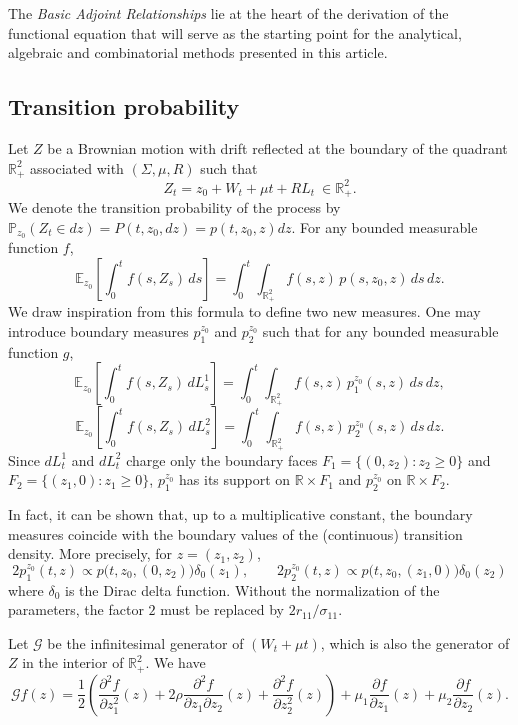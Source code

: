 \documentclass[11pt]{article}
\theoremstyle{definition}
\begin{document}
The \emph{Basic Adjoint Relationships} lie at the heart of the derivation of the functional equation that will serve as the starting point for the analytical, algebraic and combinatorial methods presented in this article.
 
\subsection{Transition probability}

Let $Z$ be a Brownian motion with drift reflected at the boundary of the quadrant $\mathbb{R}_+^2$ associated with $(\Sigma, \mu, R)$ such that
$$ Z_t=z_0 + W_t + \mu t + R L_t \ \in \mathbb{R}_+^2.$$ 
We denote the transition probability of the process by $\mathbb{P}_{z_0}(Z_t\in dz)=P(t,z_0,dz)=p(t,z_0,z) dz$.
For any bounded measurable function $f$,
\[
\mathbb{E}_{z_0}\!\left[\int_0^t f(s,Z_s)\,ds\right]
=\int_0^t\!\int_{\mathbb{R}_+^2} f(s,z)\,p(s,z_0,z)\,ds\,dz.
\]
We draw inspiration from this formula to define two new measures.
One may introduce boundary measures $p_1^{z_0}$ and $p_2^{z_0}$ such that for any bounded measurable function $g$, 
\[
\mathbb{E}_{z_0}\!\left[\int_0^t f(s,Z_s)\,dL_s^1\right]
=\int_0^t\!\int_{\mathbb{R}_+^2} f(s,z)\,p_1^{z_0}(s,z)\,ds\,dz,
\]
\[
\mathbb{E}_{z_0}\!\left[\int_0^t f( s,Z_s)\,dL_s^2\right]
=\int_0^t\!\int_{\mathbb{R}_+^2} f(s,z)\,p_2^{z_0}(s,z)\,ds\,dz.
\]
Since $dL_t^1$ and $dL_t^2$ charge only the boundary faces $
F_1=\{(0,z_2):z_2\ge0\}$ and
$F_2=\{(z_1,0):z_1\ge0\}$, $p_1^{z_0}$ has its support on $\mathbb{R}\times F_1$ and $p_2^{z_0}$ on $\mathbb{R}\times F_2$.

In fact, it can be shown that, up to a multiplicative constant, the boundary measures coincide with the boundary values of the (continuous) transition density. More precisely, for $z=(z_1,z_2)$,
\[
2 p_1^{z_0}(t,z)\propto p\bigl(t,z_0,(0,z_2)\bigr) \delta_0(z_1),
\qquad
2 p_2^{z_0}(t,z)\propto p\bigl(t,z_0,(z_1,0)\bigr) \delta_0(z_2) 
\]
where $\delta_0$ is the Dirac delta function. Without the normalization of the parameters, the factor $2$ must be replaced by $2r_{11}/\sigma_{11}$.

Let $\mathcal{G}$ be the infinitesimal generator of $(W_t +\mu t)$, which is also the generator of $Z$ in the interior of $\mathbb{R}_+^2$. We have
\begin{equation}
\label{eq:generateur}
\mathcal{G} f(z)
=
\frac{1}{2}\left(
\frac{\partial^2 f}{\partial z_1^2}(z)
+ 2\rho \frac{\partial^2 f}{\partial z_1 \partial z_2}(z)
+ \frac{\partial^2 f}{\partial z_2^2}(z)
\right)
+ \mu_1 \frac{\partial f}{\partial z_1}(z)
+ \mu_2 \frac{\partial f}{\partial z_2}(z).
\end{equation}
\end{document}

